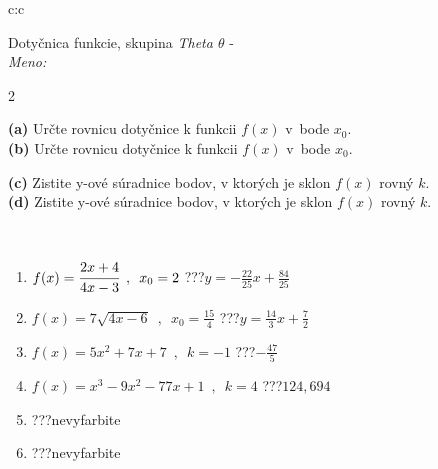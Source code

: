 \documentclass[10pt]{report}
\begin{document}
\begin{tabular}{c:c}
\begin{minipage}[c][104.5mm][t]{0.5\linewidth}
\begin{center}
\vspace{7mm}
{\huge Dotyčnica funkcie, skupina \textit{Theta $\theta$} -}\\[5mm]
\textit{Meno:}\phantom{xxxxxxxxxxxxxxxxxxxxxxxxxxxxxxxxxxxxxxxxxxxxxxxxxxxxxxxxxxxxxxxxx}\\[5mm]
\begin{minipage}{0.95\linewidth}
\begin{center}
{\small \begin{multicols}{2} \raggedright
\textbf{(a)} Určte rovnicu dotyčnice k funkcii \(f(x)\) v~bode \(x_0\). \\[1mm]
\textbf{(b)} Určte rovnicu dotyčnice k funkcii \(f(x)\) v~bode \(x_0\). \par \columnbreak
\textbf{(c)} Zistite y-ové súradnice bodov, v ktorých je sklon \(f(x)\) rovný \(k\). \\[1mm]
\textbf{(d)} Zistite y-ové súradnice bodov, v ktorých je sklon \(f(x)\) rovný \(k\). \\[1mm]
\end{multicols}
}
\end{center}
\end{minipage}
\\[4mm]
\begin{minipage}{0.79\linewidth}
\begin{center}
\begin{varwidth}{\linewidth}
\begin{enumerate}
\normalsizerr
\item $f(x)=\cfrac{2x+4}{4x-3}\enspace , \enspace x_0=2$\quad \dotfill\; ???\;\dotfill \quad $y = -\frac{22}{25}x+\frac{84}{25}$
\item $f(x)=7\sqrt{4x-6}\enspace , \enspace x_0=\frac{15}{4}$\quad \dotfill\; ???\;\dotfill \quad $y = \frac{14}{3}x+\frac{7}{2}$
\item $f(x)=5x^2+7x+7\enspace , \enspace k=-1$\quad \dotfill\; ???\;\dotfill \quad $-\frac{47}{5}$
\item $f(x)=x^3-9x^2-77x+1\enspace , \enspace k=4$\quad \dotfill\; ???\;\dotfill \quad $124 , 694$
\item \quad \dotfill\; ???\;\dotfill \quad nevyfarbite
\item \quad \dotfill\; ???\;\dotfill \quad nevyfarbite
\end{enumerate}
\end{varwidth}

\end{center}
\end{minipage}
\end{center}
\end{minipage}
\end{tabular}
\end{document}
